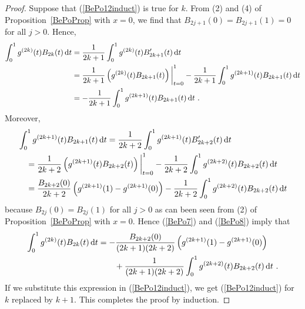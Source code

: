 \begin{proof}
Suppose that (\ref{BePo12induct}) is true for $k$.  From (2) and (4) of
Proposition~\ref{BePoProp} with $x=0$, we find that 
$B_{2j+1}(0) = B_{2j+1}(1) = 0$ for all $j>0$.  Hence,
\begin{align}
\int_0^1 g^{(2k)}(t) B_{2k}(t) \dx{t}
&= \frac{1}{2k+1} \int_0^1 g^{(2k)}(t) B_{2k+1}'(t) \dx{t}
\nonumber \\
&= \frac{1}{2k+1} \left(g^{(2k)}(t)B_{2k+1}(t)\right)\bigg|_{t=0}^1
-\frac{1}{2k+1} \int_0^1 g^{(2k+1)}(t) B_{2k+1}(t) \dx{t} \nonumber \\
&= -\frac{1}{2k+1} \int_0^1 g^{(2k+1)}(t) B_{2k+1}(t) \dx{t} \ .\label{BePo7}
\end{align}
Moreover,
\begin{align}
&\int_0^1 g^{(2k+1)}(t) B_{2k+1}(t) \,\mathrm{d}t =
\frac{1}{2k+2} \int_0^1 g^{(2k+1)}(t) B_{2k+2}'(t) \,\mathrm{d}t
\nonumber \\
&\quad = \frac{1}{2k+2}
\left( g^{(2k+1)}(t) B_{2k+2}(t) \right)\bigg|_{t=0}^1 -
\frac{1}{2k+2} \int_0^1 g^{(2k+2)}(t) B_{2k+2}(t) \,\mathrm{d}t \nonumber \\
&\quad = \frac{B_{2k+2}(0)}{2k+2}
\left( g^{(2k+1)}(1) - g^{(2k+1)}(0) \right)
- \frac{1}{2k+2} \int_0^1 g^{(2k+2)}(t) B_{2k+2}(t) \,\mathrm{d}t
\label{BePo8}
\end{align}
because $B_{2j}(0)=B_{2j}(1)$ for all $j > 0$ as can been seen
from (2) of Proposition~\ref{BePoProp} with $x = 0$.  Hence (\ref{BePo7}) and
(\ref{BePo8}) imply that
\begin{align*}
\int_0^1 g^{(2k)}(t) B_{2k}(t) \,\mathrm{d}t
&= -\frac{B_{2k+2}(0)}{(2k+1)(2k+2)}
\left( g^{(2k+1)}(1) - g^{(2k+1)}(0) \right) \\
&\qquad + \frac{1}{(2k+1)(2k+2)} \int_0^1 g^{(2k+2)}(t) B_{2k+2}(t) \,\mathrm{d}t \ .
\end{align*}
If we substitute this expression in (\ref{BePo12induct}), we get
(\ref{BePo12induct}) for $k$ replaced by $k+1$.  This completes the
proof by induction.


\end{proof}
